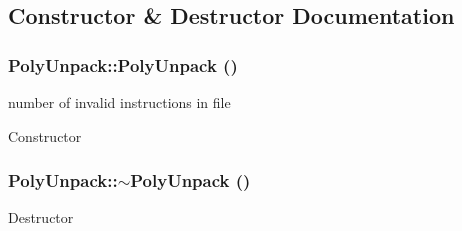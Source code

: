 \subsection{Constructor \& Destructor Documentation}
\hypertarget{classPolyUnpack_a495a7377ee57cde68b5448523ad9dbd2}{
\subsubsection[{PolyUnpack}]{\setlength{\rightskip}{0pt plus 5cm}PolyUnpack::PolyUnpack ()}}
\label{classPolyUnpack_a495a7377ee57cde68b5448523ad9dbd2}


number of invalid instructions in file 

Constructor \hypertarget{classPolyUnpack_a37b0a31d4565390894037d2dc9b8fe08}{
\subsubsection[{$\sim$PolyUnpack}]{\setlength{\rightskip}{0pt plus 5cm}PolyUnpack::$\sim$PolyUnpack ()}}
\label{classPolyUnpack_a37b0a31d4565390894037d2dc9b8fe08}
Destructor 

